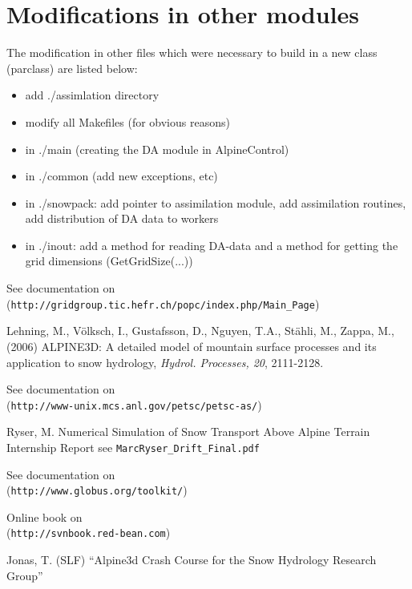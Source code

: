 \documentclass[12pt]{report}
\begin{document}
\section{Modifications in other modules}
The modification in other files which were necessary to build in a new
class (parclass) are listed below:
\begin{itemize}
\item  add ./assimlation directory
\item modify all Makefiles (for obvious reasons)
\item in ./main (creating the DA module in AlpineControl)
\item in ./common (add new exceptions, etc)
\item in ./snowpack: add pointer to assimilation module, add
  assimilation routines, add distribution of DA data to workers
\item in ./inout: add a method for reading DA-data and a method for
  getting the grid dimensions (GetGridSize(...))
\end{itemize}

\begin{thebibliography}{99}
  See documentation on \\
  (\verb+http://gridgroup.tic.hefr.ch/popc/index.php/Main_Page+)
  
    Lehning, M., V\"olksch, I., Gustafsson, D., Nguyen, T.A., St\"ahli, M.,
    Zappa, M., (2006)
    ALPINE3D: A detailed model of mountain surface processes and its
    application to snow hydrology,
    \textit{Hydrol. Processes, 20}, 2111-2128.

  See documentation on \\
  (\verb+http://www-unix.mcs.anl.gov/petsc/petsc-as/+)

  Ryser, M.
  Numerical Simulation of Snow Transport Above Alpine Terrain
  Internship Report
  see \verb+MarcRyser_Drift_Final.pdf+

  See documentation on \\
  (\verb+http://www.globus.org/toolkit/+)

  Online book on\\
  (\verb+http://svnbook.red-bean.com+)

  Jonas, T. (SLF)
  ``Alpine3d Crash Course for the Snow Hydrology Research Group''
  
\end{thebibliography}
\end{document}
